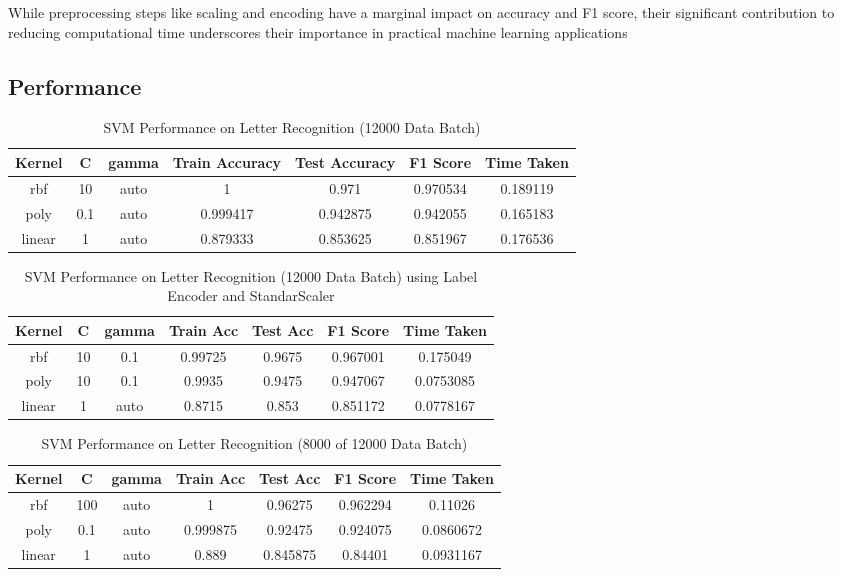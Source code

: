 \documentclass[conference]{IEEEtran}
\begin{document}
While preprocessing steps like scaling and encoding have a marginal impact on accuracy and F1 score, their significant contribution to reducing computational time underscores their importance in practical machine learning applications

\subsection{Performance}

\begin{table}[H]
\centering
\caption{SVM Performance on Letter Recognition (12000 Data Batch)}
\begin{tabular}{|c|c|c|c|c|c|c|}
\hline 
Kernel & C & gamma & Train Accuracy & Test Accuracy & F1 Score & Time Taken\\ \hline
rbf & 10 & auto & 1 & 0.971 & 0.970534 & 0.189119\\ \hline
poly & 0.1 & auto & 0.999417 & 0.942875 & 0.942055 & 0.165183\\ \hline
linear & 1 &auto & 0.879333 & 0.853625 & 0.851967 & 0.176536\\ \hline
\end{tabular}
\end{table}


\begin{table}[H]
\centering
\caption{SVM Performance on Letter Recognition (12000 Data Batch) using Label Encoder and StandarScaler}
\begin{tabular}{|c|c|c|c|c|c|c|}
\hline 
Kernel & C & gamma & Train Acc & Test Acc & F1 Score & Time Taken\\ \hline
rbf & 10 & 0.1 & 0.99725 & 0.9675 & 0.967001 & 0.175049\\ \hline
poly & 10 & 0.1 & 0.9935 & 0.9475 & 0.947067 & 0.0753085\\ \hline
linear & 1 & auto & 0.8715 & 0.853 & 0.851172 & 0.0778167\\ \hline
\end{tabular}
\end{table}


\begin{table}[H]
\centering
\caption{SVM Performance on Letter Recognition (8000 of 12000 Data Batch)}
\begin{tabular}{|c|c|c|c|c|c|c|}
\hline
Kernel & C & gamma & Train Acc & Test Acc & F1 Score & Time Taken \\ \hline
rbf & 100 & auto & 1 & 0.96275 & 0.962294 & 0.11026 \\ \hline
poly & 0.1 & auto & 0.999875 & 0.92475 & 0.924075 & 0.0860672 \\ \hline
linear & 1 & auto & 0.889 & 0.845875 & 0.84401 & 0.0931167 \\ \hline
\end{tabular}
\end{table}
\end{document}
